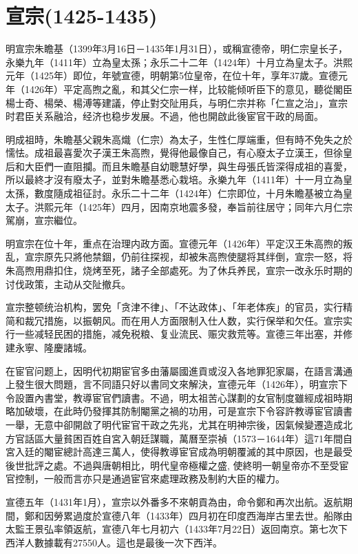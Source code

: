 
\section{宣宗\tiny(1425-1435)}

明宣宗朱瞻基（1399年3月16日－1435年1月31日），或稱宣德帝，明仁宗皇长子，永樂九年（1411年）立為皇太孫；永乐二十二年（1424年）十月立為皇太子。洪熙元年（1425年）即位，年號宣德，明朝第5位皇帝，在位十年，享年37歲。宣德元年（1426年）平定高煦之亂，和其父仁宗一样，比较能倾听臣下的意见，聽從閣臣楊士奇、楊榮、楊溥等建議，停止對交阯用兵，与明仁宗并称「仁宣之治」，宣宗时君臣关系融洽，经济也稳步发展。不過，他也開啟此後宦官干政的局面。

明成祖時，朱瞻基父親朱高熾（仁宗）為太子，生性仁厚端重，但有時不免失之於懦怯。成祖最喜愛次子漢王朱高煦，覺得他最像自己，有心廢太子立漢王，但徐皇后和大臣們一直阻攔。而且朱瞻基自幼聰慧好學，與生母張氏皆深得成祖的喜愛，所以最終才沒有廢太子，並對朱瞻基悉心栽培。永樂九年（1411年）十一月立為皇太孫，數度隨成祖征討。永乐二十二年（1424年）仁宗即位，十月朱瞻基被立為皇太子。洪熙元年（1425年）四月，因南京地震多發，奉旨前往居守；同年六月仁宗駕崩，宣宗繼位。

明宣宗在位十年，重点在治理内政方面。宣德元年（1426年）平定汉王朱高煦的叛乱，宣宗原先只將他禁錮，仍前往探视，却被朱高煦使腿将其绊倒，宣宗一怒，将朱高煦用鼎扣住，烧烤至死，諸子全部處死。为了休兵养民，宣宗一改永乐时期的讨伐政策，主动从交阯撤兵。

宣宗整顿统治机构，罢免「贪津不律」、「不达政体」、「年老体疾」的官员，实行精简和裁冗措施，以振朝风。而在用人方面限制入仕人数，实行保举和欠任。宣宗实行一些减轻民困的措施，减免税粮、复业流民、赈灾救荒等。宣德三年出塞，并修建永寧、隆慶諸城。

在宦官问题上，因明代初期宦官多由藩屬國進貢或沒入各地罪犯家屬，在語言溝通上發生很大問題，言不同語只好以書同文來解決，宣德元年（1426年），明宣宗下令設置內書堂，教導宦官們讀書。不過，明太祖苦心謀劃的女官制度雖經成祖時期略加破壞，在此時仍發揮其防制閹黨之禍的功用，可是宣宗下令容許教導宦官讀書一舉，无意中卻開啟了明代宦官干政之先兆，尤其在明神宗後，因氣候變遷造成北方官話區大量貧困百姓自宮入朝廷謀職，萬曆至崇禎（1573－1644年）這71年間自宮入廷的閹宦總計高達三萬人，使得教導宦官成為明朝覆滅的其中原因，也是最受後世批評之處。不過與唐朝相比，明代皇帝極權之盛, 使終明一朝皇帝亦不至受宦官控制，一般而言亦只是通過宦官來處理政務及制約大臣的權力。

宣德五年（1431年1月），宣宗以外番多不來朝貢為由，命令鄭和再次出航。返航期間，鄭和因勞累過度於宣德八年（1433年）四月初在印度西海岸古里去世。船隊由太監王景弘率領返航，宣德八年七月初六（1433年7月22日）返回南京。第七次下西洋人數據載有27550人。這也是最後一次下西洋。

